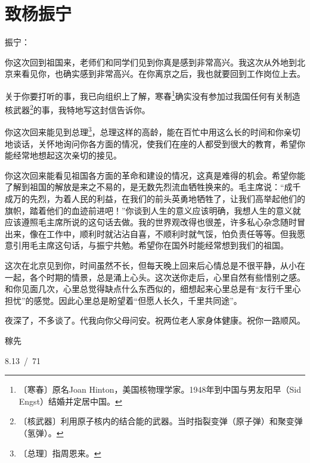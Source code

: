 \documentclass[12pt,UTF-8,openany]{ctexbook}
\begin{document}
\chapter{致杨振宁}

\begin{normalsize}
    
    \noindent 振宁：
    
    \vspace{24pt}
    
    你这次回到祖国来，老师们和同学们见到你真是感到非常高兴。我这次从外地到北京来看见你，也确实感到非常高兴。在你离京之后，我也就要回到工作岗位上去。
    
    关于你要打听的事，我已向组织上了解，寒春\footnote{〔寒春〕原名Joan Hinton，美国核物理学家。1948年到中国与男友阳早（Sid Engst）结婚并定居中国。}确实没有参加过我国任何有关制造核武器\footnote{〔核武器〕利用原子核内的结合能的武器。当时指裂变弹（原子弹）和聚变弹（氢弹）。}的事，我特地写这封信告诉你。
    
    你这次回来能见到总理\footnote{〔总理〕指周恩来。}，总理这样的高龄，能在百忙中用这么长的时间和你亲切地谈话，关怀地询问你各方面的情况，使我们在座的人都受到很大的教育，希望你能经常地想起这次亲切的接见。
    
    你这次回来能看见祖国各方面的革命和建设的情况，这真是难得的机会。希望你能了解到祖国的解放是来之不易的，是无数先烈流血牺牲换来的。毛主席说：“成千成万的先烈，为着人民的利益，在我们的前头英勇地牺牲了，让我们高举起他们的旗帜，踏着他们的血迹前进吧！”你谈到人生的意义应该明确，我想人生的意义就应该遵照毛主席所说的这句话去做。我的世界观改得也很差，许多私心杂念随时冒出来，像在工作中，顺利时就沾沾自喜，不顺利时就气馁，怕负责任等等。但我愿意引用毛主席这句话，与振宁共勉。希望你在国外时能经常想到我们的祖国。
    
    这次在北京见到你，时间虽然不长，但每天晚上回来后心情总是不很平静，从小在一起，各个时期的情景，总是涌上心头。这次送你走后，心里自然有些惜别之感。和你见面几次，心里总觉得缺点什么东西似的，细想起来心里总是有“友行千里心担忧”的感觉。因此心里总是盼望着“但愿人长久，千里共同途”。
    
    夜深了，不多谈了。代我向你父母问安。祝两位老人家身体健康。祝你一路顺风。
    
    \hfill 稼先
    
    \hfill 8.13~/~71
    
    \vspace{36pt}
    
    \begin{flushright}
        
    \end{flushright}
    
    
    
\end{normalsize}
\end{document}
